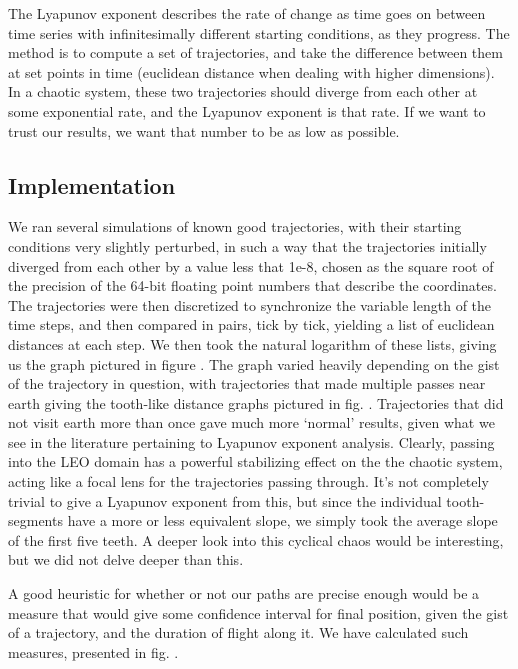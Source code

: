 The Lyapunov exponent describes the rate of change as time goes on between time series with infinitesimally different starting conditions, as they progress. The method is to compute a set of trajectories, and take the difference between them at set points in time (euclidean distance when dealing with higher dimensions). In a chaotic system, these two trajectories should diverge from each other at some exponential rate, and the Lyapunov exponent is that rate. If we want to trust our results, we want that number to be as low as possible. 

\subsection{Implementation}

We ran several simulations of known good trajectories, with their starting conditions very slightly perturbed, in such a way that the trajectories initially diverged from each other by a value less that 1e-8, chosen as the square root of the precision of the 64-bit floating point numbers that describe the coordinates. The trajectories were then discretized to synchronize the variable length of the time steps, and then compared in pairs, tick by tick, yielding a list of euclidean distances at each step. We then took the natural logarithm of these lists, giving us the graph pictured in figure . The graph varied heavily depending on the gist of the trajectory in question, with trajectories that made multiple passes near earth giving the tooth-like distance graphs pictured in fig. . Trajectories that did not visit earth more than once gave much more `normal' results, given what we see in the literature pertaining to Lyapunov exponent analysis. Clearly, passing into the LEO domain has a powerful stabilizing effect on the the chaotic system, acting like a focal lens for the trajectories passing through. It's not completely trivial to give a Lyapunov exponent from this, but since the individual tooth-segments have a more or less equivalent slope, we simply took the average slope of the first five teeth. A deeper look into this cyclical chaos would be interesting, but we did not delve deeper than this.

A good heuristic for whether or not our paths are precise enough would be a measure that would give some confidence interval for final position, given the gist of a trajectory, and the duration of flight along it. We have calculated such measures, presented in fig. .

